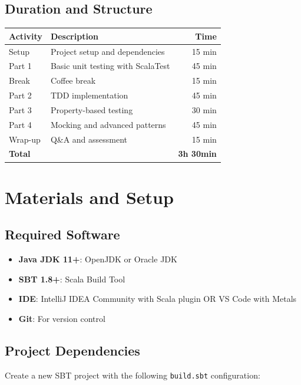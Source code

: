 \documentclass[12pt,a4paper]{article}
\begin{document}
\subsection{Duration and Structure}
\begin{table}[h]
\centering
\begin{tabularx}{\textwidth}{|l|X|r|}
\hline
\textbf{Activity} & \textbf{Description} & \textbf{Time} \\
\hline
Setup & Project setup and dependencies & 15 min \\
Part 1 & Basic unit testing with ScalaTest & 45 min \\
Break & Coffee break & 15 min \\
Part 2 & TDD implementation & 45 min \\
Part 3 & Property-based testing & 30 min \\
Part 4 & Mocking and advanced patterns & 45 min \\
Wrap-up & Q\&A and assessment & 15 min \\
\hline
\textbf{Total} & & \textbf{3h 30min} \\
\hline
\end{tabularx}
\end{table}

\section{Materials and Setup}

\subsection{Required Software}
\begin{itemize}
  \item \textbf{Java JDK 11+}: OpenJDK or Oracle JDK
  \item \textbf{SBT 1.8+}: Scala Build Tool
  \item \textbf{IDE}: IntelliJ IDEA Community with Scala plugin OR VS Code with Metals
  \item \textbf{Git}: For version control
\end{itemize}

\subsection{Project Dependencies}
Create a new SBT project with the following \texttt{build.sbt} configuration:
\end{document}
